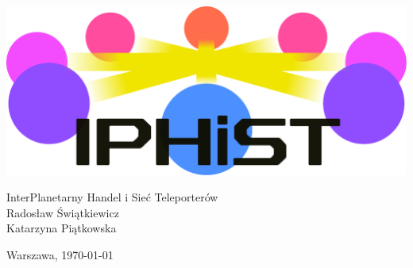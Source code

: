 \begin{titlepage}
\pagestyle{empty}

\vfill
\begin{center}
\includegraphics[width=\textwidth]{img/logo.pdf}
\end{center}

\begin{center}
\Large
InterPlanetarny Handel i Sieć Teleporterów \\
\large
Radosław Świątkiewicz\\
Katarzyna Piątkowska
\end{center}


\vfill
\begin{center}
Warszawa, \today
\end{center}

\end{titlepage} 
